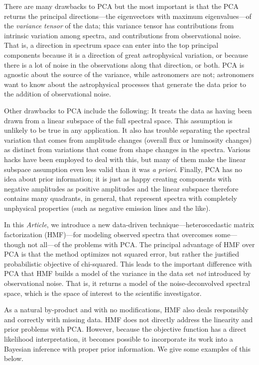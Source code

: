 \documentclass[12pt,preprint]{aastex}
\newcommand{\documentname}{\textsl{Article}}
\begin{document}
There are many drawbacks to PCA but the most important is that the PCA
returns the principal directions---the eigenvectors with maximum
eigenvalues---of the \emph{variance tensor} of the data; this variance
tensor has contributions from intrinsic variation among spectra, and
contributions from observational noise.  That is, a direction in
spectrum space can enter into the top principal components because it
is a direction of great astrophysical variation, or because there is a
lot of noise in the observations along that direction, or both.  PCA
is agnostic about the source of the variance, while astronomers are
not; astronomers want to know about the astrophysical processes that
generate the data prior to the addition of observational noise.

Other drawbacks to PCA include the following: It treats the data as
having been drawn from a linear subspace of the full spectral
space. This assumption is unlikely to be true in any application.  It
also has trouble separating the spectral variation that comes from
amplitude changes (overall flux or luminosity changes) as distinct
from variations that come from shape changes in the spectra.  Various
hacks have been employed to deal with this, but many of them make the
linear subspace assumption even less valid than it was \textit{a
  priori}. Finally, PCA has no idea about prior information; it is
just as happy creating components with negative amplitudes as positive
amplitudes and the linear subspace therefore contains many quadrants,
in general, that represent spectra with completely unphysical
properties (such as negative emission lines and the like).

In this \documentname, we introduce a new data-driven
technique---heteroscedastic matrix factorization (HMF)---for modeling
observed spectra that overcomes some---though not all---of the
problems with PCA.  The principal advantage of HMF over PCA is that
the method optimizes not squared error, but rather the justified
probabilistic objective of chi-squared.  This leads to the important
difference with PCA that HMF builds a model of the variance in the
data set \emph{not} introduced by observational noise.  That is, it
returns a model of the noise-deconvolved spectral space, which is the
space of interest to the scientific investigator.

As a natural by-product and with no modifications, HMF also deals
responsibly and correctly with missing data.  HMF does not directly
address the linearity and prior problems with PCA.  However, because
the objective function has a direct likelihood interpretation, it
becomes possible to incorporate its work into a Bayesian inference
with proper prior information.  We give some examples of this below.
\end{document}
